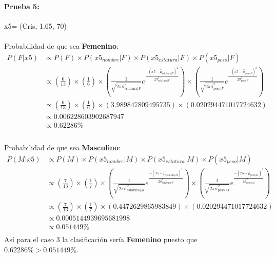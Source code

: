 \documentclass[12pt]{article}
\begin{document}
 \paragraph{Prueba 5: }x5= (Cris, 1.65, 70)
 \paragraph{}Probabilidad de que sea \textbf{Femenino}:\\
 \begin{equation}
 \begin{split}
 P(F|x5) &\propto P(F) \times P(x5_{nombre}|F) \times P(x5_{estatura}|F) \times P(x5_{peso}|F) \\
 &\propto (\frac{6}{13}) \times (\frac{1}{6}) \times (\frac{1}{\sqrt{2\pi\hat{\sigma}_{\text{estatura}|F}^2}}e^{\frac{-(x5 - \hat{\mu}_{\text{estatura}|F})^2}{2\hat{\sigma}_{\text{estatura}|F}^2}}) \times (\frac{1}{\sqrt{2\pi\hat{\sigma}_{\text{peso}|F}^2}}e^{\frac{-(x5 - \hat{\mu}_{\text{peso}|F})^2}{2\hat{\sigma}_{\text{peso}|F}^2}}) \\
 &\propto (\frac{6}{13}) \times (\frac{1}{6}) \times (3.989847809495735) \times (0.020294471017724632) \\
 &\propto 0.006228603902687947 \\
 &\propto 0.62286\% \\
 \end{split}
 \end{equation}
 \paragraph{}Probabilidad de que sea \textbf{Masculino}:\\
 \begin{equation}
 \begin{split}
 P(M|x5) &\propto P(M) \times P(x5_{nombre}|M) \times P(x5_{estatura}|M) \times P(x5_{peso}|M) \\
 &\propto (\frac{7}{13}) \times (\frac{1}{7}) \times (\frac{1}{\sqrt{2\pi\hat{\sigma}_{\text{estatura}|M}^2}}e^{\frac{-(x5 - \hat{\mu}_{\text{estatura}|M})^2}{2\hat{\sigma}_{\text{estatura}|F}^2}}) \times (\frac{1}{\sqrt{2\pi\hat{\sigma}_{\text{peso}|M}^2}}e^{\frac{-(x5 - \hat{\mu}_{\text{peso}|M})^2}{2\hat{\sigma}_{\text{peso}|M}^2}}) \\
 &\propto (\frac{7}{13}) \times (\frac{1}{7}) \times (0.4472629865983849) \times (0.020294471017724632) \\
 &\propto 0.0005144939695681998 \\
 &\propto 0.051449 \% \\
 \end{split}
 \end{equation}
 Así para el caso 3 la clasificación sería \textbf{Femenino} puesto que $0.62286\% > 0.051449\%$.\\
\end{document}
